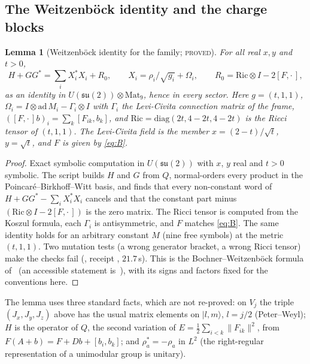 \documentclass[11pt]{article}
\newtheorem{lemma}[theorem]{Lemma}
\theoremstyle{definition}
\theoremstyle{remark}
\newcommand{\su}{\mathfrak{su}(2)}
\newcommand{\norm}[1]{\lVert #1\rVert}
\newcommand{\PROVED}{\textsc{proved}}
\begin{document}
\subsection{The Weitzenb\"ock identity and the charge blocks}\label{subsec:blocks}

\begin{lemma}[Weitzenb\"ock identity for the family; \PROVED]\label{lem:weitz}
For all real $x,y$ and $t>0$,
\begin{equation}\label{eq:weitz}
  H+GG^*=\sum_iX_i^*X_i+R_0,\qquad X_i=\rho_i/\sqrt{g_i}+\Omega_i,\qquad R_0=\mathrm{Ric}\otimes I-2[F,\cdot\,],
\end{equation}
as an identity in $U(\su)\otimes\mathrm{Mat}_9$, hence in every sector. Here $g=(t,1,1)$,
$\Omega_i=I\otimes\mathrm{ad}\,M_i-\Gamma_i\otimes I$ with $\Gamma_i$ the Levi-Civita connection matrix of the frame,
$([F,\cdot\,]b)_i=\sum_k[F_{ik},b_k]$, and $\mathrm{Ric}=\mathrm{diag}(2t,4-2t,4-2t)$ is the Ricci tensor of $(t,1,1)$.
The Levi-Civita field is the member $x=(2-t)/\sqrt t$, $y=\sqrt t$, and $F$ is given by \eqref{eq:B}.
\end{lemma}
\begin{proof}
Exact symbolic computation in $U(\su)$ with $x$, $y$ real and $t>0$ symbolic. The script builds $H$ and $G$ from $Q$,
normal-orders every product in the Poincar\'e--Birkhoff--Witt basis, and finds that every non-constant word of
$H+GG^*-\sum_iX_i^*X_i$ cancels and that the constant part minus $(\mathrm{Ric}\otimes I-2[F,\cdot\,])$ is the zero
matrix. The Ricci tensor is computed from the Koszul formula, each $\Gamma_i$ is antisymmetric, and $F$ matches
\eqref{eq:B}. The same identity holds for an arbitrary constant $M$ (nine free symbols) at the metric $(t,1,1)$. Two
mutation tests (a wrong generator bracket, a wrong Ricci tensor) make the checks fail
(, receipt
, $21.7$\,s). This is the Bochner--Weitzenb\"ock
formula of~\cite{bl1981} (an accessible statement is~\cite{hanwen2026}), with its signs and factors fixed for the
conventions here.
\end{proof}

The lemma uses three standard facts, which are not re-proved: on $V_j$ the triple $(J_x,J_y,J_z)$ above has the usual
matrix elements on $|l,m\rangle$, $l=j/2$ (Peter--Weyl); $H$ is the operator of $Q$, the second variation of
$E=\tfrac12\sum_{i<k}\norm{F_{ik}}^2$, from $F(A+b)=F+Db+[b_i,b_k]$; and $\rho_a^*=-\rho_a$ in $L^2$ (the right-regular
representation of a unimodular group is unitary).
\end{document}
